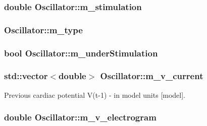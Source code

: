 \hypertarget{class_oscillator_afc8f8dc1e06529009d1919a74c92f5f3}{
\subsubsection[{m\+\_\+stimulation}]{\setlength{\rightskip}{0pt plus 5cm}double Oscillator\+::m\+\_\+stimulation}}\label{class_oscillator_afc8f8dc1e06529009d1919a74c92f5f3}
\hypertarget{class_oscillator_a7553dcea69896c2f3ff2bc8bda1d05cc}{
\subsubsection[{m\+\_\+type}]{ Oscillator\+::m\+\_\+type}}\label{class_oscillator_a7553dcea69896c2f3ff2bc8bda1d05cc}
\hypertarget{class_oscillator_aeaa03f804f9d13f27635b94ea7a6bd32}{
\subsubsection[{m\+\_\+under\+Stimulation}]{\setlength{\rightskip}{0pt plus 5cm}bool Oscillator\+::m\+\_\+under\+Stimulation}}\label{class_oscillator_aeaa03f804f9d13f27635b94ea7a6bd32}
\hypertarget{class_oscillator_a344928736ed0deb40bc1c73d50af5d33}{
\subsubsection[{m\+\_\+v\+\_\+current}]{\setlength{\rightskip}{0pt plus 5cm}std\+::vector$<$double$>$ Oscillator\+::m\+\_\+v\+\_\+current}}\label{class_oscillator_a344928736ed0deb40bc1c73d50af5d33}


Previous cardiac potential V(t-\/1) -\/ in model units \mbox{[}model\mbox{]}. 

\hypertarget{class_oscillator_ab65a59d93c248616facbd1f01b3c2b87}{
\subsubsection[{m\+\_\+v\+\_\+electrogram}]{\setlength{\rightskip}{0pt plus 5cm}double Oscillator\+::m\+\_\+v\+\_\+electrogram}}\label{class_oscillator_ab65a59d93c248616facbd1f01b3c2b87}


